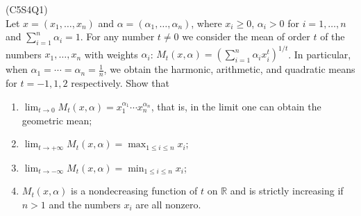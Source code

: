 \begin{prb}
    (C5S4Q1) \\
    Let $x = (x_1, \ldots, x_n)$ and $\alpha = (\alpha_1, \ldots, \alpha_n)$, where $x_i \geq 0$, $\alpha_i > 0$ for $i = 1, \ldots, n$ and $\sum_{i=1}^n \alpha_i = 1$. For any number $t \neq 0$ we consider the mean of order $t$ of the numbers $x_1, \ldots, x_n$ with weights $\alpha_i$: $M_t(x, \alpha) = \left( \sum_{i=1}^n \alpha_i x_i^t \right)^{1/t}$.
    In particular, when $\alpha_1 = \cdots = \alpha_n = \frac{1}{n}$, we obtain the harmonic, arithmetic, and quadratic means for $t = -1, 1, 2$ respectively.
    Show that
    \begin{enumerate}
        \item[a)] $\lim_{t \to 0} M_t(x, \alpha) = x_1^{\alpha_1} \cdots x_n^{\alpha_n}$, that is, in the limit one can obtain the geometric mean;
        \item[b)] $\lim_{t \to +\infty} M_t(x, \alpha) = \max_{1 \leq i \leq n} x_i$;
        \item[c)] $\lim_{t \to -\infty} M_t(x, \alpha) = \min_{1 \leq i \leq n} x_i$;
        \item[d)] $M_t(x, \alpha)$ is a nondecreasing function of $t$ on $\mathbb{R}$ and is strictly increasing if $n > 1$ and the numbers $x_i$ are all nonzero.
    \end{enumerate}
\end{prb}

%